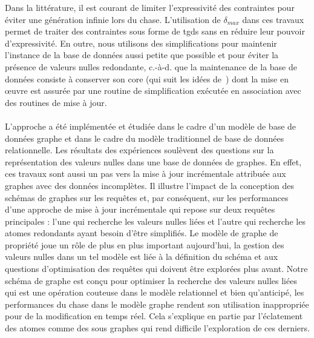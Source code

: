 Dans la littérature, il est courant de limiter l'expressivité des contraintes pour éviter une génération infinie lors du \gls{chase}.
L'utilisation de $\delta_{max}$ dans ces travaux permet de traiter des contraintes sous forme de \glspl{tgd} sans en réduire leur pouvoir d'expressivité.
En outre, nous utilisons des simplifications pour maintenir l'instance de la base de données aussi petite que possible et pour éviter la présence de valeurs nulles redondante, c.-à-d. que la maintenance de la base de données consiste à conserver son \gls{core} (qui suit les idées de~\cite{faginDataExchangeGetting2005}) dont la mise en œuvre est assurée par une routine de simplification exécutée en association avec des routines de mise à jour.

\paragraph{}
L'approche a été implémentée et étudiée dans le cadre d'un modèle de base de données graphe et dans le cadre du modèle traditionnel de base de données relationnelle.
Les résultats des expériences soulèvent des questions sur la représentation des valeurs nulles dans une base de données de graphes.
En effet, ces travaux sont aussi un pas vers la mise à jour incrémentale attribuée aux graphes avec des données incomplètes.
Il illustre l'impact de la conception des schémas de graphes sur les requêtes et, par conséquent, sur les performances d'une approche de mise à jour incrémentale qui repose sur deux requêtes principales : l'une qui recherche les valeurs nulles liées et l'autre qui recherche les atomes redondants ayant besoin d'être simplifiés.
Le modèle de graphe de propriété joue un rôle de plus en plus important aujourd'hui, la gestion des valeurs nulles dans un tel modèle est liée à la définition du schéma et aux questions d'optimisation des requêtes qui doivent être explorées plus avant.
Notre schéma de graphe est conçu pour optimiser la recherche des valeurs nulles liées qui est une opération couteuse dans le modèle relationnel et bien qu'anticipé, les performances du \gls{chase} dans le modèle graphe rendent son utilisation inappropriée pour de la modification en temps réel.
Cela s'explique en partie par l'éclatement des atomes comme des sous graphes qui rend difficile l'exploration de ces derniers.

